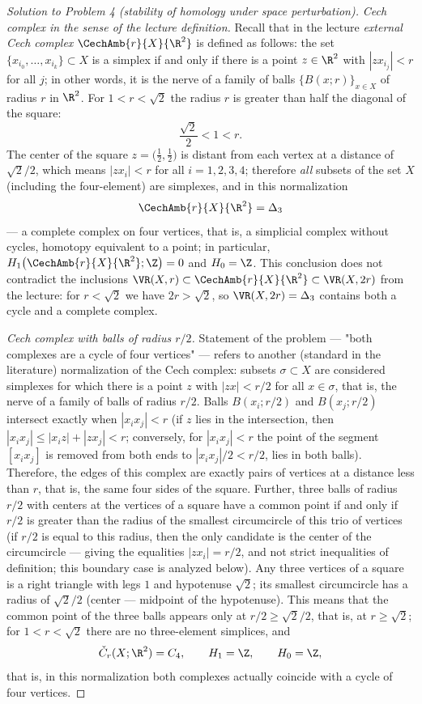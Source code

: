 \documentclass[a4paper,12pt]{report}
\begin{document}
\begin{proof}[Solution to Problem \textup{4} \textup{(}stability of homology under space perturbation\textup{)}]
\emph{Cech complex in the sense of the lecture definition.} Recall that in the lecture \emph{external Cech complex} $\CechAmb{r}{X}{\R^2}$ is defined as follows: the set $\{x_{i_0},\dots,x_{i_k}\}\subset X$ is a simplex if and only if there is a point $z\in\R^2$ with $|zx_{i_j}|<r$ for all $j$; in other words, it is the nerve of a family of balls $\{B(x;r)\}_{x\in X}$ of radius $r$ in $\R^2$. For $1<r<\sqrt2$ the radius $r$ is greater than half the diagonal of the square:
\[
\frac{\sqrt2}{2}<1<r .
\]
The center of the square $z=\bigl(\tfrac12,\tfrac12\bigr)$ is distant from each vertex at a distance of $\sqrt2/2$, which means $|zx_i|<r$ for all $i=1,2,3,4$; therefore \emph{all} subsets of the set $X$ \textup{(}including the four-element\textup{)} are simplexes, and in this normalization
\[
\CechAmb{r}{X}{\R^2}=\Delta_3
\]
--- a complete complex on four vertices, that is, a simplicial complex without cycles, homotopy equivalent to a point; in particular, $H_1\bigl(\CechAmb{r}{X}{\R^2};\Z\bigr)=0$ and $H_0=\Z$. This conclusion does not contradict the inclusions $\VR(X,r)\subset\CechAmb{r}{X}{\R^2}\subset\VR(X,2r)$ from the lecture: for $r<\sqrt2$ we have $2r>\sqrt2$, so $\VR(X,2r)=\Delta_3$ contains both a cycle and a complete complex.

\emph{Cech complex with balls of radius $r/2$.} Statement of the problem --- "both complexes are a cycle of four vertices" --- refers to another \textup{(}standard in the literature\textup{)} normalization of the Cech complex: subsets $\sigma\subset X$ are considered simplexes for which there is a point $z$ with $|zx|<r/2$ for all $x\in\sigma$, that is, the nerve of a family of balls of radius $r/2$. Balls $B(x_i;r/2)$ and $B(x_j;r/2)$ intersect exactly when $|x_ix_j|<r$ \textup{(}if $z$ lies in the intersection, then $|x_ix_j|\le|x_iz|+|zx_j|<r$; conversely, for $|x_ix_j|<r$ the point of the segment $[x_ix_j]$ is removed from both ends to $|x_ix_j|/2<r/2$, lies in both balls\textup{)}. Therefore, the edges of this complex are exactly pairs of vertices at a distance less than $r$, that is, the same four sides of the square. Further, three balls of radius $r/2$ with centers at the vertices of a square have a common point if and only if $r/2$ is greater than the radius of the smallest circumcircle of this trio of vertices \textup{(}if $r/2$ is equal to this radius, then the only candidate is the center of the circumcircle --- giving the equalities $|zx_i|=r/2$, and not strict inequalities of definition\textup{;} this boundary case is analyzed below\textup{)}. Any three vertices of a square is a right triangle with legs $1$ and hypotenuse $\sqrt2$; its smallest circumcircle has a radius of $\sqrt2/2$ \textup{(}center --- midpoint of the hypotenuse\textup{)}. This means that the common point of the three balls appears only at $r/2\ge\sqrt2/2$, that is, at $r\ge\sqrt2$; for $1<r<\sqrt2$ there are no three-element simplices, and
\[
\check C_r(X;\R^2)=C_4,\qquad H_1=\Z,\qquad H_0=\Z ,
\]
that is, in this normalization both complexes actually coincide with a cycle of four vertices.


\end{proof}
\end{document}
